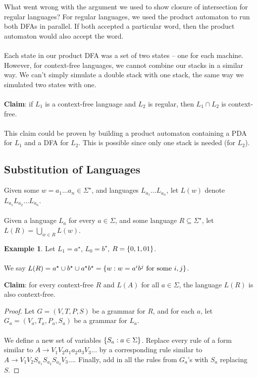 \documentclass[]{article}
\DeclarePairedDelimiter{\set}{\lbrace}{\rbrace}
\theoremstyle{definition}
\newtheorem{ex}{Example}[section]
\begin{document}
          What went wrong with the argument we used to show closure of intersection for regular languages? For regular languages, we used the product automaton to run both DFAs in parallel. If both accepted a particular word, then the product automaton would also accept the word.
          \\ \\
          Each state in our product DFA was a set of two states -- one for each machine. However, for context-free languages, we cannot combine our stacks in a similar way. We can't simply simulate a double stack with one stack, the same way we simulated two states with one.
          \\ \\
          \textbf{Claim}: if $L_1$ is a context-free language and $L_2$ is regular, then $L_1 \cap L_2$ is context-free.
          \\ \\
          This claim could be proven by building a product automaton containing a PDA for $L_1$ and a DFA for $L_2$. This is possible since only one stack is needed (for $L_2$).

      \subsection{Substitution of Languages}
        Given some $w = a_1 \ldots a_n \in \Sigma^\star$, and languages $L_{a_1} \ldots L_{a_n}$, let $L(w)$ denote $L_{a_1} L_{a_2} \ldots L_{a_n}$.
        \\ \\
        Given a language $L_a$ for every $a \in \Sigma$, and some language $R \subseteq \Sigma^\star$, let $L(R) = \displaystyle \bigcup_{w \in R} L(w)$.

        \begin{ex}
          Let $L_1 = a^\star$, $L_0 = b^\star$, $R = \set{0, 1, 01}$.
          \\ \\
          We say $L(R) = a^\star \cup b^\star \cup a^\star b^\star = \set{ w : w = a^i b^j \text{ for some } i, j}$.
        \end{ex}

        \textbf{Claim}: for every context-free $R$ and $L(A)$ for all $a \in \Sigma$, the language $L(R)$ is also context-free.

        \begin{proof}
          Let $G = (V, T, P, S)$ be a grammar for $R$, and for each $a$, let $G_a = (V_a, T_a, P_a, S_a)$ be a grammar for $L_a$.
          \\ \\
          We define a new set of variables $\set{ S_a : a \in \Sigma}$. Replace every rule of a form similar to $A \to V_1 V_2 a_1 a_2 a_3 V_3 \ldots$ by a corresponding rule similar to $A \to V_1 V_2 S_{a_1} S_{a_2} S_{a_3} V_3 \ldots$. Finally, add in all the rules from $G_a$'s with $S_a$ replacing $S$.
        \end{proof}
\end{document}
